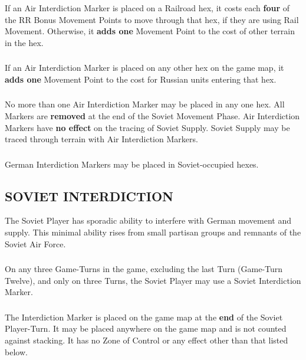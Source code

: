 \subsubsection{} If an Air Interdiction Marker is placed on a Railroad hex, it costs each \textbf{four} of the RR Bonus Movement Points to move through that hex, if they are using Rail Movement. Otherwise, it \textbf{adds one} Movement Point to the cost of other terrain in the hex.

\subsubsection{} If an Air Interdiction Marker is placed on any other hex on the game map, it \textbf{adds one} Movement Point to the cost for Russian units entering that hex.

\subsubsection{} No more than one Air Interdiction Marker may be placed in any one hex. All Markers are \textbf{removed} at the end of the Soviet Movement Phase. Air Interdiction Markers have \textbf{no effect} on the tracing of Soviet Supply. Soviet Supply may be traced through terrain with Air Interdiction Markers.

\subsubsection{} German Interdiction Markers may be placed in Soviet-occupied hexes.

\subsection{SOVIET INTERDICTION}

The Soviet Player has sporadic ability to interfere with German movement and supply. This minimal ability rises from small partisan groups and remnants of the Soviet Air Force.

\subsubsection{} On any three Game-Turns in the game, excluding the last Turn (Game-Turn Twelve), and only on three Turns, the Soviet Player may use a Soviet Interdiction Marker.

\subsubsection{} The Interdiction Marker is placed on the game map at the \textbf{end} of the Soviet Player-Turn. It may be placed anywhere on the game map and is not counted against stacking. It has no Zone of Control or any effect other than that listed below.

